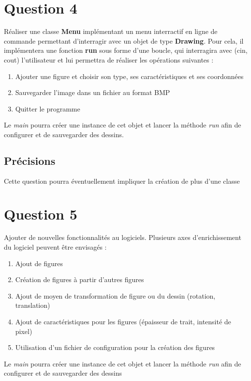 \documentclass[
	12pt, %
]{fphw}
\begin{document}

\section*{Question 4}

\begin{problem}
	Réaliser une classe \textbf{Menu} implémentant un menu interractif en ligne de commande permettant d'interragir avec un objet de type \textbf{Drawing}.
	Pour cela, il implémentera une fonction \textbf{run} sous forme d'une boucle, qui interragira avec (cin, cout) l'utilisateur et lui permettra de réaliser les opérations suivantes :
	\begin{enumerate}
		\item Ajouter une figure et choisir son type, ses caractéristiques et ses coordonnées
		\item Sauvegarder l'image dans un fichier au format BMP
		\item Quitter le programme
	\end{enumerate}

	Le \emph{main} pourra créer une instance de cet objet et lancer la méthode \emph{run} afin de configurer et de sauvegarder des dessins.
\end{problem}


\subsection*{Précisions}

Cette question pourra éventuellement impliquer la création de plus d'une classe



\section*{Question 5}

\begin{problem}
	Ajouter de nouvelles fonctionnalités au logiciels. Plusieurs axes d'enrichissement du logiciel peuvent être envisagés :
	\begin{enumerate}
		\item Ajout de figures
		\item Création de figures à partir d'autres figures
		\item Ajout de moyen de transformation de figure ou du dessin (rotation, translation)
		\item Ajout de caractéristiques pour les figures (épaisseur de trait, intensité de pixel)
		\item Utilisation d'un fichier de configuration pour la création des figures
	\end{enumerate}

	Le \emph{main} pourra créer une instance de cet objet et lancer la méthode \emph{run} afin de configurer et de sauvegarder des dessins
\end{problem}
\end{document}
